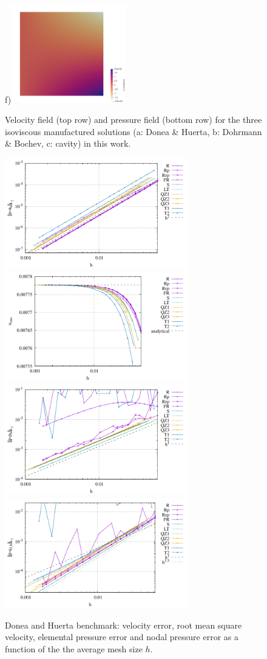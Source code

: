 \documentclass[a4paper,12pt]{article}
\begin{document}
\begin{figure}[t]
f)\includegraphics[width=5cm]{../images/fields/press_cavity}
\caption{Velocity field (top row) and pressure field (bottom 
row) for the three isoviscous manufactured solutions (a: Donea \& Huerta, 
b: Dohrmann \& Bochev, c: cavity) in this work. \label{fig:dh1}}
\end{figure}

\begin{figure}
\centering
\includegraphics[width=8cm]{../results/errors_u_exp1}
\includegraphics[width=8cm]{../results/vrms_exp1} \\
\includegraphics[width=8cm]{../results/errors_p_exp1}
\includegraphics[width=8cm]{../results/errors_q1_exp1}
\caption{Donea and Huerta benchmark: velocity error, 
root mean square velocity, elemental pressure error and nodal pressure error
as a function of the the average mesh size $h$.} 
\label{fig:resdh}
\end{figure}
\end{document}
